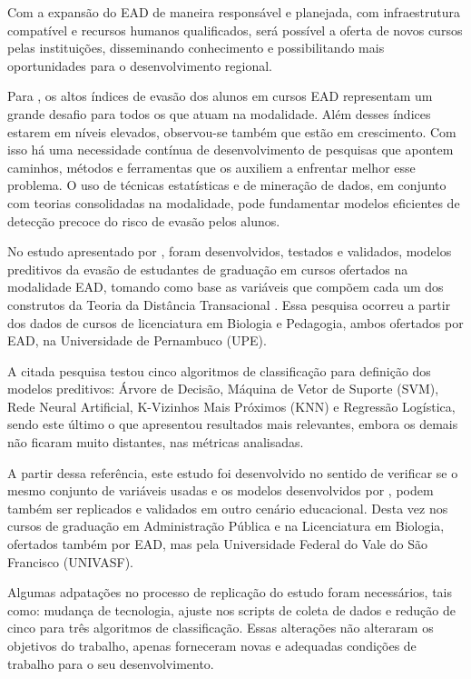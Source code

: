 Com a expansão do EAD de maneira responsável e planejada, com infraestrutura
compatível e recursos humanos qualificados, será possível a oferta de novos
cursos pelas instituições, disseminando conhecimento e possibilitando mais
oportunidades para o desenvolvimento regional.

Para , os altos índices de evasão dos alunos em cursos 
EAD representam um grande desafio para todos os que atuam na modalidade. Além desses 
índices estarem em níveis elevados, observou-se também que estão em crescimento. 
Com isso há uma necessidade contínua de desenvolvimento de pesquisas que apontem caminhos,
métodos e ferramentas que os auxiliem a enfrentar melhor esse problema. O uso de
técnicas estatísticas e de mineração de dados, em conjunto com teorias
consolidadas na modalidade, pode fundamentar modelos eficientes de detecção
precoce do risco de evasão pelos alunos.

No estudo apresentado por , foram desenvolvidos, 
testados e validados, modelos preditivos da evasão de estudantes de graduação em 
cursos ofertados na modalidade EAD, tomando como base as variáveis que compõem cada 
um dos construtos da Teoria da Distância Transacional \cite{moore2008teoria}. Essa 
pesquisa ocorreu a partir dos dados de cursos de licenciatura em Biologia e Pedagogia,
ambos ofertados por EAD, na Universidade de Pernambuco (UPE).

A citada pesquisa testou cinco algoritmos de classificação para definição dos modelos preditivos:  
Árvore de Decisão, Máquina de Vetor de Suporte (SVM), Rede Neural Artificial, K-Vizinhos 
Mais Próximos (KNN) e Regressão Logística, sendo este último o que apresentou resultados mais
relevantes, embora os demais não ficaram muito distantes, nas métricas analisadas.

A partir dessa referência, este estudo foi desenvolvido no sentido de verificar se o mesmo 
conjunto de variáveis usadas e os modelos desenvolvidos por , podem também 
ser replicados e validados em outro cenário educacional. Desta vez nos cursos 
de graduação em Administração Pública e na Licenciatura em Biologia, ofertados também 
por EAD, mas pela Universidade Federal do Vale do São Francisco (UNIVASF).

Algumas adpatações no processo de replicação do estudo foram necessários, tais como: mudança 
de tecnologia, ajuste nos scripts de coleta de dados e redução de cinco para três algoritmos 
de classificação. Essas alterações não alteraram os objetivos do trabalho, apenas forneceram
novas e adequadas condições de trabalho para o seu desenvolvimento.

